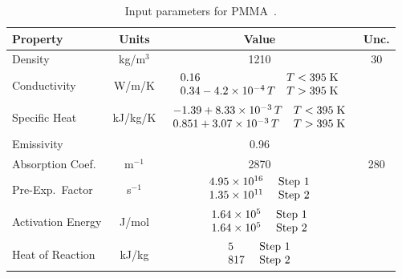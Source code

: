 \begin{table}[!h]
\caption[NIST PMMA properties]{Input parameters for PMMA~\cite{Fiola:FSJ2021}.}
\begin{center}
\begin{tabular}{|l|c|c|c|}
\hline
Property                    & Units         & Value                                                                                                                                        & Unc.           \\ \hline \hline
Density                     & kg/m$^3$      & 1210                                                                                                                                         & 30             \\ \hline
Conductivity                & W/m/K         & $\begin{array}{ll} 0.16  & T<395 \; \hbox{K} \\  0.34 - 4.2 \times 10^{-4} \, T  & T>395 \; \hbox{K} \end{array}$                            &                \\ \hline
Specific Heat               & kJ/kg/K       & $\begin{array}{ll} -1.39+ 8.33 \times 10^{-3} \, T & T<395 \; \hbox{K} \\ 0.851 + 3.07 \times 10^{-3} \, T & T>395 \; \hbox{K} \end{array}$  &                \\ \hline
Emissivity                  &               & 0.96                                                                                                                                         &                \\ \hline
Absorption Coef.            & m$^{-1}$      & 2870                                                                                                                                         & 280            \\ \hline
Pre-Exp.~Factor             & s$^{-1}$      & $\begin{array}{ll} 4.95 \times 10^{16} & \hbox{ Step 1} \\ 1.35 \times 10^{11} & \hbox{ Step 2} \end{array}$                                 &                \\ \hline
Activation Energy           & J/mol         & $\begin{array}{ll} 1.64 \times 10^{5}  & \hbox{ Step 1} \\ 1.64 \times 10^{5}  & \hbox{ Step 2} \end{array}$                                 &                \\ \hline
Heat of Reaction            & kJ/kg         & $\begin{array}{ll} 5                   & \hbox{ Step 1} \\ 817                 & \hbox{ Step 2} \end{array}$                                 &                \\ \hline
\end{tabular}
\end{center}
\label{NIST_PMMA_Properties}
\end{table}

